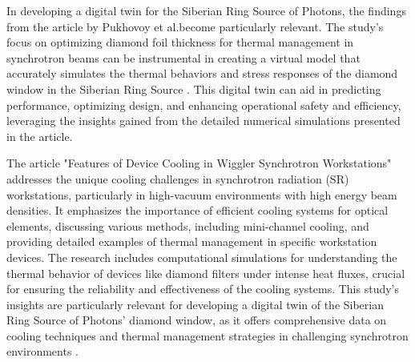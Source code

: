 In developing a digital twin for the Siberian Ring Source of Photons, the
findings from the article by Pukhovoy et al.become particularly relevant. The
study's focus on optimizing diamond foil thickness for thermal management in
synchrotron beams can be instrumental in creating a virtual model that
accurately simulates the thermal behaviors and stress responses of the diamond
window in the Siberian Ring Source \cite{pukhovoy2023numerical}. This digital twin
can aid in predicting performance, optimizing design, and enhancing operational
safety and efficiency, leveraging the insights gained from the detailed
numerical simulations presented in the article.

The article "Features of Device Cooling in Wiggler Synchrotron Workstations"
addresses the unique cooling challenges in synchrotron radiation (SR)
workstations, particularly in high-vacuum environments with high energy beam
densities. It emphasizes the importance of efficient cooling systems for
optical elements, discussing various methods, including mini-channel cooling,
and providing detailed examples of thermal management in specific workstation
devices. The research includes computational simulations for understanding the
thermal behavior of devices like diamond filters under intense heat fluxes,
crucial for ensuring the reliability and effectiveness of the cooling systems.
This study's insights are particularly relevant for developing a digital twin
of the Siberian Ring Source of Photons' diamond window, as it offers
comprehensive data on cooling techniques and thermal management strategies in
challenging synchrotron environments \cite{KabovDiamondWindow}.

